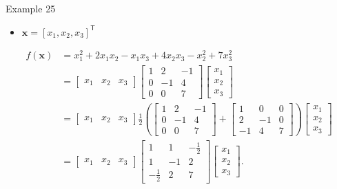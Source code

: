 \documentclass[aspectratio=169,hyperref,UTF8,CJK]{beamer}
\newcommand{\trans}{\mathsf{T}}
\newcommand{\vect}[1]{\boldsymbol{#1}}
\begin{document}
\begin{frame}{Example 25}
  \small
  \begin{itemize}
    \item $\vect{x}=[x_1,x_2,x_3]^{\trans}$
  \end{itemize}
  \begin{align*}
    f(\vect{x})
    &=x_1^2+2x_1x_2-x_1x_3+4x_2x_3-x_2^2+7x_3^2\\
    &=\begin{bmatrix}x_1&x_2&x_3\end{bmatrix}
      \begin{bmatrix}1&2&-1\\0&-1&4\\0&0&7\end{bmatrix}
      \begin{bmatrix}x_1\\x_2\\x_3\end{bmatrix}\\
    &=\begin{bmatrix}x_1&x_2&x_3\end{bmatrix}
      \frac{1}{2}\left(
      \begin{bmatrix}1&2&-1\\0&-1&4\\0&0&7\end{bmatrix}
      +\begin{bmatrix}1&0&0\\2&-1&0\\-1&4&7\end{bmatrix}\right)
      \begin{bmatrix}x_1\\x_2\\x_3\end{bmatrix}\\
    &=\begin{bmatrix}x_1&x_2&x_3\end{bmatrix}
      \begin{bmatrix}1&1&-\frac12\\1&-1&2\\-\frac12&2&7\end{bmatrix}
      \begin{bmatrix}x_1\\x_2\\x_3\end{bmatrix}.
  \end{align*}
\end{frame}
\end{document}
